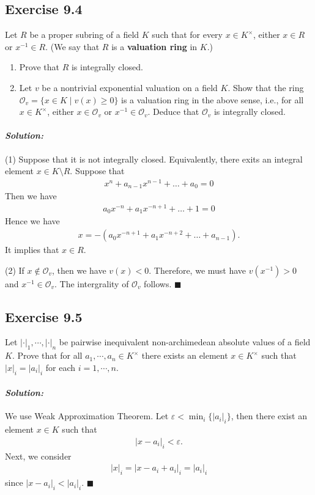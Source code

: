 \documentclass[12pt, a4paper]{article}
\renewcommand{\o}{\mathcal{O}}
\newenvironment{solution}
  {\paragraph{\textit{Solution:}}\par\medskip}
  {\hfill$\blacksquare$\vspace{0.1cm}}
\begin{document}
\subsection*{Exercise 9.4}
Let $R$ be a proper subring of a field $K$ such that for every $x \in K^\times$, either $x \in R$ or $x^{-1} \in R$. (We say that $R$ is a \textbf{valuation ring} in $K$.)
\begin{enumerate}
    \item Prove that $R$ is integrally closed.
    \item Let $v$ be a nontrivial exponential valuation on a field $K$. Show that the ring $\mathcal{O}_v = \{x \in K \mid v(x) \ge 0\}$ is a valuation ring in the above sense, i.e., for all $x \in K^\times$, either $x \in \mathcal{O}_v$ or $x^{-1} \in \mathcal{O}_v$. Deduce that $\mathcal{O}_v$ is integrally closed.
\end{enumerate}
\begin{solution}
    (1) Suppose that it is not integrally closed. Equivalently, there exits an integral element $x\in K\setminus R$. Suppose that 
    \begin{align*}
        x^n + a_{n-1}x^{n-1}+\dots+a_0 = 0
    \end{align*}
    Then we have 
    \begin{align*}
        a_0x^{-n} + a_1x^{-n+1}+\dots+1 = 0
    \end{align*}
    Hence we have 
    \begin{align*}
        x = -(a_0x^{-n+1}+a_1x^{-n+2}+\dots+a_{n-1}).
    \end{align*}
    It implies that $x\in R$.

    (2) If $x\notin \o_v$, then we have $v(x)<0$. Therefore, we must have $v(x^{-1})>0$ and $x^{-1}\in\o_v$. The intergrality of $\o_v$ follows.
\end{solution}


\subsection*{Exercise 9.5}
Let $|\cdot|_1, \cdots, |\cdot|_n$ be pairwise inequivalent non-archimedean absolute values of a field $K$. Prove that for all $a_1, \cdots, a_n \in K^\times$ there exists an element $x \in K^\times$ such that $|x|_i = |a_i|_i$ for each $i = 1, \cdots, n$.
\begin{solution}
    We use Weak Approximation Theorem. Let $\varepsilon<\min_i\{|a_i|_i\}$, then there exist an element $x\in K$ such that 
    \begin{align*}
        |x-a_i|_i<\varepsilon.
    \end{align*}
    Next, we consider 
    \begin{align*}
        |x|_i = |x-a_i+a_i|_i = |a_i|_i
    \end{align*}
    since $|x-a_i|_i<|a_i|_i$.
\end{solution}
\end{document}
